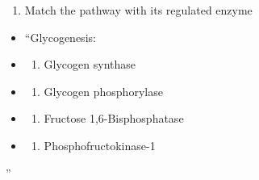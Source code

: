 \documentclass[
]{book}
\providecommand{\tightlist}{%
  \setlength{\itemsep}{0pt}\setlength{\parskip}{0pt}}
\begin{document}
\begin{enumerate}
\def\labelenumi{\arabic{enumi}.}
\setcounter{enumi}{1}
\tightlist
\item
  Match the pathway with its regulated enzyme
\end{enumerate}

\begin{itemize}
\item
  ``Glycogenesis:
\item
  \begin{enumerate}
  \def\labelenumi{(\Alph{enumi})}
  \tightlist
  \item
    Glycogen synthase\\
  \end{enumerate}
\item
  \begin{enumerate}
  \def\labelenumi{(\Alph{enumi})}
  \setcounter{enumi}{1}
  \tightlist
  \item
    Glycogen phosphorylase\\
  \end{enumerate}
\item
  \begin{enumerate}
  \def\labelenumi{(\Alph{enumi})}
  \setcounter{enumi}{2}
  \tightlist
  \item
    Fructose 1,6-Bisphosphatase\\
  \end{enumerate}
\item
  \begin{enumerate}
  \def\labelenumi{(\Alph{enumi})}
  \setcounter{enumi}{3}
  \tightlist
  \item
    Phosphofructokinase-1
  \end{enumerate}
\end{itemize}

''
\end{document}
